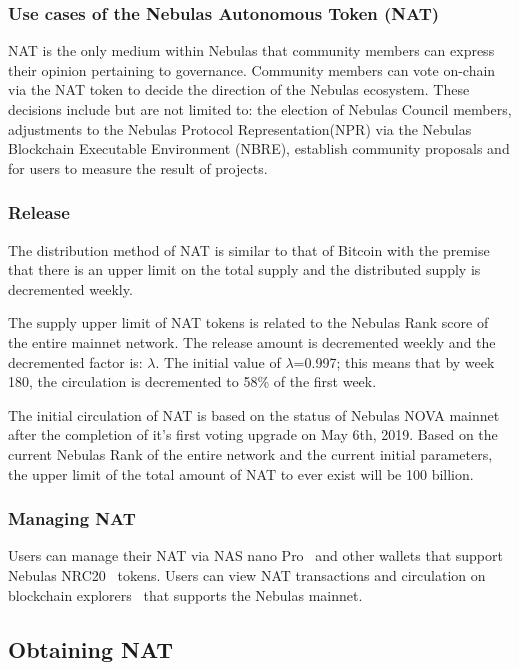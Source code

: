 \subsubsection{Use cases of the Nebulas Autonomous Token (NAT)}

NAT is the only medium within Nebulas that community members can express their opinion pertaining to governance. Community members can vote on-chain via the NAT token to decide the direction of the Nebulas ecosystem. These decisions include but are not limited to: the election of Nebulas Council members, adjustments to the Nebulas Protocol Representation(NPR) via the Nebulas Blockchain Executable Environment (NBRE), establish community proposals and for users to measure the result of projects.

\subsubsection{Release}
	
The distribution method of NAT is similar to that of Bitcoin with the premise that there is an upper limit on the total supply and the distributed supply is decremented weekly.

The supply upper limit of NAT tokens is related to the Nebulas Rank score of the entire mainnet network. The release amount is decremented weekly and the decremented factor is: $\lambda$. The initial value of $\lambda$=0.997; this means that by week 180, the circulation is decremented to 58\% of the first week.

The initial circulation of NAT is based on the status of Nebulas NOVA mainnet after the completion of it's first voting upgrade on May 6th, 2019. Based on the current Nebulas Rank of the entire network and the current initial parameters, the upper limit of the total amount of NAT to ever exist will be 100 billion.

\subsubsection{Managing NAT}

Users can manage their NAT via NAS nano Pro~\cite{NASnano} and other wallets that support Nebulas NRC20~\cite{wallets} tokens. Users can view NAT transactions and circulation on blockchain explorers~\cite{explorer} that supports the Nebulas mainnet.

\subsection{Obtaining NAT}

